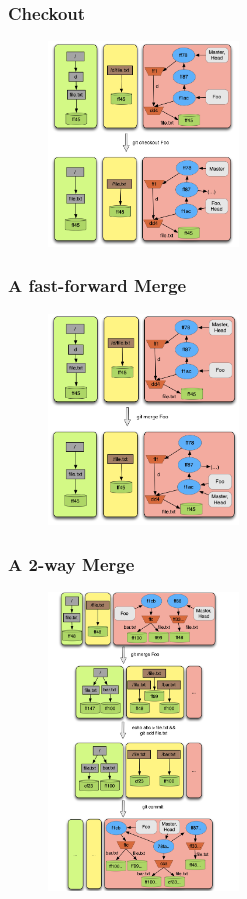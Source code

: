 \documentclass{beamer}
\begin{document}
\begin{frame}[fragile]
   \frametitle{Checkout}
   \begin{figure}
      \centering
      \includegraphics[width=0.45\textwidth]{images/checkout.png}
   \end{figure}
\end{frame}

\begin{frame}[fragile]
   \frametitle{ A fast-forward Merge}
   \begin{figure}
      \centering
      \includegraphics[width=0.45\textwidth]{images/fastforwardmerge.png}
   \end{figure}
\end{frame}

\begin{frame}[fragile]
   \frametitle{A 2-way Merge}
   \begin{figure}
      \centering
      \includegraphics[width=0.45\textwidth]{images/merge2way.png}
   \end{figure}
\end{frame}
\end{document}
